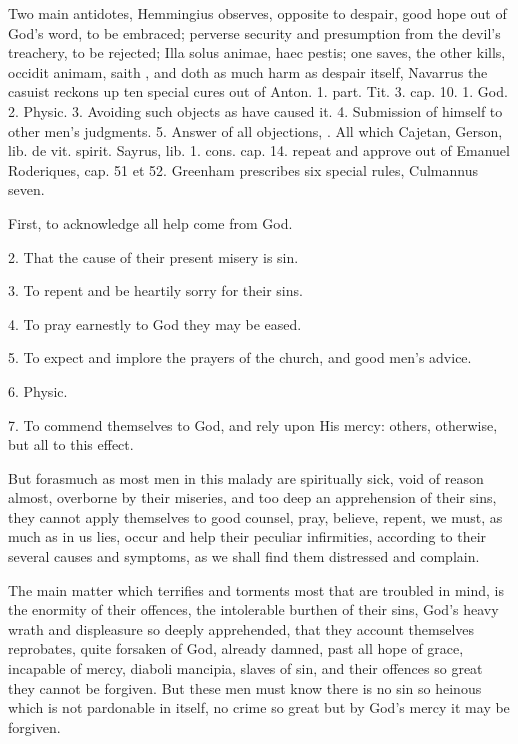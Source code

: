{Two main antidotes, Hemmingius observes, opposite to despair,
good hope out of God's word, to be embraced; perverse security and
presumption from the devil's treachery, to be rejected; Illa solus
animae, haec pestis; one saves, the other kills, occidit animam, saith
\Austin{}, and doth as much harm as despair itself, Navarrus the
casuist reckons up ten special cures out of Anton. 1. part. Tit. 3.
cap. 10. 1. God. 2. Physic. 3. Avoiding such objects as have
caused it. 4. Submission of himself to other men's judgments. 5. Answer
of all objections, \etc{}. All which Cajetan, Gerson, lib. de vit. spirit.
Sayrus, lib. 1. cons. cap. 14. repeat and approve out of Emanuel
Roderiques, cap. 51 et 52. Greenham prescribes six special rules,
Culmannus seven.

First, to acknowledge all help come from God.

2. That the cause of their present misery is sin.

3. To repent and be heartily sorry for their sins.

4. To pray earnestly to God they may be eased.

5. To expect and implore the prayers of the church, and good men's advice.

6. Physic.

7. To commend themselves to God, and rely upon His mercy: others, otherwise, but all to this effect.

But forasmuch as most men in
this malady are spiritually sick, void of reason almost, overborne by
their miseries, and too deep an apprehension of their sins, they cannot
apply themselves to good counsel, pray, believe, repent, we must, as
much as in us lies, occur and help their peculiar infirmities,
according to their several causes and symptoms, as we shall find them
distressed and complain.

The main matter which terrifies and torments most that are troubled in
mind, is the enormity of their offences, the intolerable burthen of
their sins, God's heavy wrath and displeasure so deeply apprehended,
that they account themselves reprobates, quite forsaken of God, already
damned, past all hope of grace, incapable of mercy, diaboli mancipia,
slaves of sin, and their offences so great they cannot be forgiven. But
these men must know there is no sin so heinous which is not pardonable
in itself, no crime so great but by God's mercy it may be forgiven.

}
